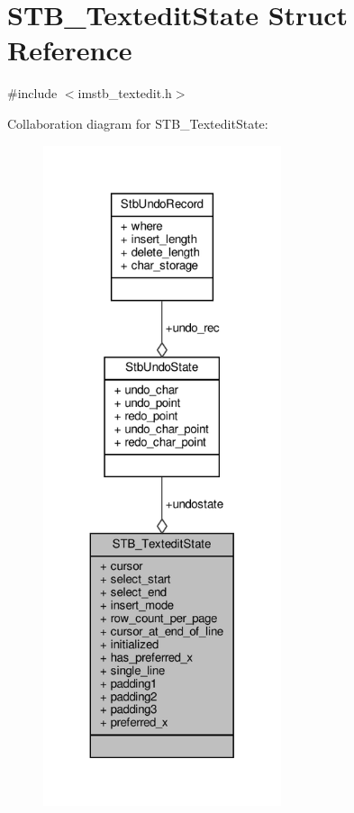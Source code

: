 \hypertarget{structSTB__TexteditState}{}\section{S\+T\+B\+\_\+\+Textedit\+State Struct Reference}
\label{structSTB__TexteditState}


{\ttfamily \#include $<$imstb\+\_\+textedit.\+h$>$}



Collaboration diagram for S\+T\+B\+\_\+\+Textedit\+State\+:
\nopagebreak
\begin{figure}[H]
\begin{center}
\leavevmode
\includegraphics[height=550pt]{structSTB__TexteditState__coll__graph}
\end{center}
\end{figure}

